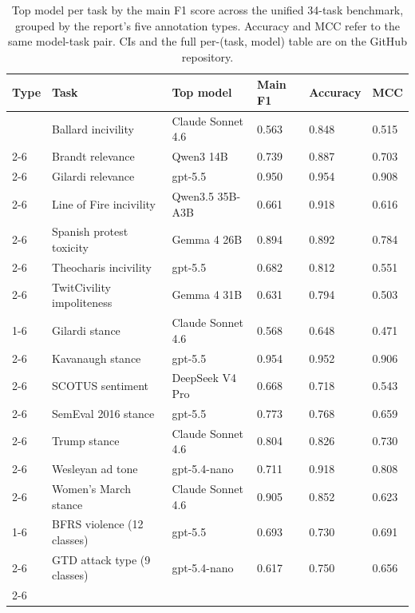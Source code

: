 \begin{table}[H]
\centering
\caption{Top model per task by the main F1 score across the unified 34-task benchmark, grouped by the report's five annotation types. Accuracy and MCC refer to the same model-task pair. CIs and the full per-(task, model) table are on the GitHub repository. \label{tab:winners}}
\centering
\fontsize{8.5}{10.5}\selectfont
\begin{tabular}[t]{llllll}
\toprule
Type & Task & Top model & Main F1 & Accuracy & MCC\\
\midrule
 & Ballard incivility & Claude Sonnet 4.6 & 0.563 & 0.848 & 0.515\\
\cmidrule{2-6}
 & Brandt relevance & Qwen3 14B & 0.739 & 0.887 & 0.703\\
\cmidrule{2-6}
 & Gilardi relevance & gpt-5.5 & 0.950 & 0.954 & 0.908\\
\cmidrule{2-6}
 & Line of Fire incivility & Qwen3.5 35B-A3B & 0.661 & 0.918 & 0.616\\
\cmidrule{2-6}
 & Spanish protest toxicity & Gemma 4 26B & 0.894 & 0.892 & 0.784\\
\cmidrule{2-6}
 & Theocharis incivility & gpt-5.5 & 0.682 & 0.812 & 0.551\\
\cmidrule{2-6}
\multirow[t]{-7}{*}{\raggedright\arraybackslash Relevance \& Harm} & TwitCivility impoliteness & Gemma 4 31B & 0.631 & 0.794 & 0.503\\
\cmidrule{1-6}
 & Gilardi stance & Claude Sonnet 4.6 & 0.568 & 0.648 & 0.471\\
\cmidrule{2-6}
 & Kavanaugh stance & gpt-5.5 & 0.954 & 0.952 & 0.906\\
\cmidrule{2-6}
 & SCOTUS sentiment & DeepSeek V4 Pro & 0.668 & 0.718 & 0.543\\
\cmidrule{2-6}
 & SemEval 2016 stance & gpt-5.5 & 0.773 & 0.768 & 0.659\\
\cmidrule{2-6}
 & Trump stance & Claude Sonnet 4.6 & 0.804 & 0.826 & 0.730\\
\cmidrule{2-6}
 & Wesleyan ad tone & gpt-5.4-nano & 0.711 & 0.918 & 0.808\\
\cmidrule{2-6}
\multirow[t]{-7}{*}{\raggedright\arraybackslash Position \& Tone} & Women's March stance & Claude Sonnet 4.6 & 0.905 & 0.852 & 0.623\\
\cmidrule{1-6}
 & BFRS violence (12 classes) & gpt-5.5 & 0.693 & 0.730 & 0.691\\
\cmidrule{2-6}
 & GTD attack type (9 classes) & gpt-5.4-nano & 0.617 & 0.750 & 0.656\\
\cmidrule{2-6}

\end{tabular}
\end{table}
